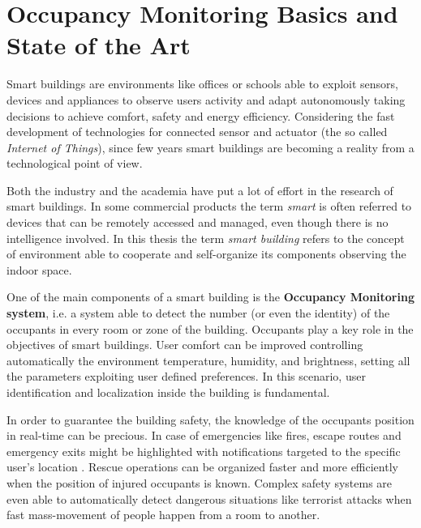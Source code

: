 %
%
\chapter[Occupancy Monitoring and State of the Art]{Occupancy Monitoring Basics and State of the Art}
%
%
\label{cap:soa}
%

Smart buildings are environments like offices or schools able to exploit sensors, devices and appliances to observe users activity and adapt autonomously taking decisions to achieve comfort, safety and energy efficiency. Considering the fast development of technologies for connected sensor and actuator (the so called \emph{Internet of Things}), since few years smart buildings are becoming a reality from a technological point of view.

Both the industry and the academia have put a lot of effort in the research of smart buildings. In some commercial products the term \emph{smart} is often referred to devices that can be remotely accessed and managed, even though there is no intelligence involved. In this thesis the term \emph{smart building} refers to the concept of environment able to cooperate and self-organize its components observing the indoor space.

\medskip
One of the main components of a smart building is the \textbf{Occupancy Monitoring system}, i.e. a system able to detect the number (or even the identity) of the occupants in every room or zone of the building. Occupants play a key role in the objectives of smart buildings. User comfort can be improved controlling automatically the environment temperature, humidity, and brightness, setting all the parameters exploiting user defined preferences. In this scenario, user identification and localization inside the building is fundamental. 

\smallskip
In order to guarantee the building safety, the knowledge of the occupants position in real-time can be precious. In case of emergencies like fires, escape routes and emergency exits might be highlighted with notifications targeted to the specific user's location \cite{Piscitello2015}. Rescue operations can be organized faster and more efficiently when the position of injured occupants is known. Complex safety systems are even able to automatically detect dangerous situations like terrorist attacks when fast mass-movement of people happen from a room to another.

